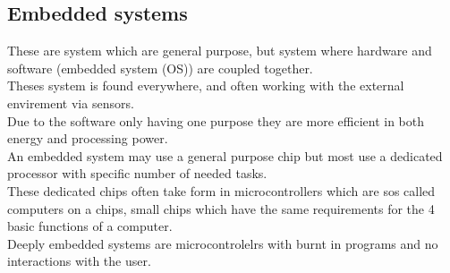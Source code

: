 \documentclass[12pt, a4paper]{article}
\begin{document}
		\subsection{Embedded systems}
			These are system which are general purpose, but system where hardware and software (embedded system (OS)) are coupled together.\\
			Theses system is found everywhere, and often working with the external envirement via sensors.\\
			Due to the software only having one purpose they are more efficient in both energy and processing power.\\
			An embedded system may use a general purpose chip but most use a dedicated processor with specific number of needed tasks.\\
			These dedicated chips often take form in microcontrollers which are sos called computers on a chips, small chips which have the same requirements for the 4 basic functions of a computer.\\
			Deeply embedded systems are microcontrolelrs with burnt in programs and no interactions with the user.
\end{document}
